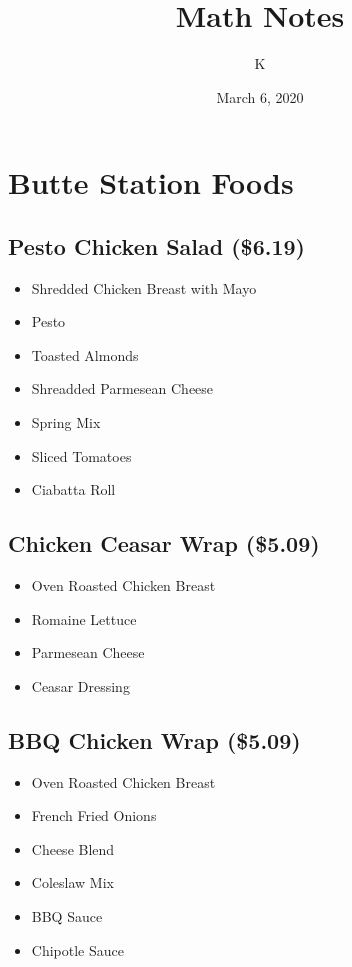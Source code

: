\documentclass[12pt, letterpaper]{article}
\title{Math Notes}
\author{K}
\date{March 6, 2020}
\begin{document}
\begin{comment}
\begin{titlepage}
    \maketitle
\end{titlepage}
\end{comment}

\maketitle

\tableofcontents{}
\pagebreak

\section{Butte Station Foods}

\subsection{Pesto Chicken Salad (\$6.19)}
\begin{itemize}
  \item Shredded Chicken Breast with Mayo
  \item Pesto
  \item Toasted Almonds
  \item Shreadded Parmesean Cheese
  \item Spring Mix
  \item Sliced Tomatoes
  \item Ciabatta Roll
\end{itemize}

\subsection{Chicken Ceasar Wrap (\$5.09)}
\begin{itemize}
  \item Oven Roasted Chicken Breast
  \item Romaine Lettuce
  \item Parmesean Cheese
  \item Ceasar Dressing
\end{itemize}

\subsection{BBQ Chicken Wrap (\$5.09)}
\begin{itemize}
  \item Oven Roasted Chicken Breast
  \item French Fried Onions
  \item Cheese Blend
  \item Coleslaw Mix
  \item BBQ Sauce
  \item Chipotle Sauce
\end{itemize}
\end{document}
